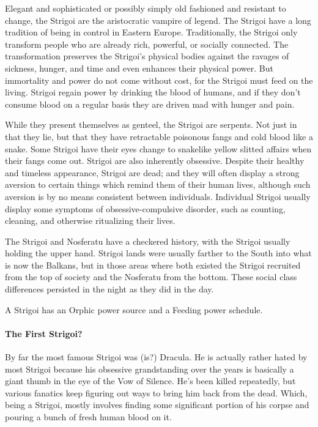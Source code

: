 Elegant and sophisticated or possibly simply old fashioned and resistant to change, the Strigoi are the aristocratic vampire of legend. The Strigoi have a long tradition of being in control in Eastern Europe. Traditionally, the Strigoi only transform people who are already rich, powerful, or socially connected. The transformation preserves the Strigoi's physical bodies against the ravages of sickness, hunger, and time and even enhances their physical power. But immortality and power do not come without cost, for the Strigoi must feed on the living. Strigoi regain power by drinking the blood of humans, and if they don't consume blood on a regular basis they are driven mad with hunger and pain.

While they present themselves as genteel, the Strigoi are serpents. Not just in that they lie, but that they have retractable poisonous fangs and cold blood like a snake. Some Strigoi have their eyes change to snakelike yellow slitted affairs when their fangs come out. Strigoi are also inherently obsessive. Despite their healthy and timeless appearance, Strigoi are dead; and they will often display a strong aversion to certain things which remind them of their human lives, although such aversion is by no means consistent between individuals. Individual Strigoi usually display some symptoms of obsessive-compulsive disorder, such as counting, cleaning, and otherwise ritualizing their lives.

The Strigoi and Nosferatu have a checkered history, with the Strigoi usually holding the upper hand. Strigoi lands were usually farther to the South into what is now the Balkans, but in those areas where both existed the Strigoi recruited from the top of society and the Nosferatu from the bottom. These social class differences persisted in the night as they did in the day.

A Strigoi has an Orphic power source and a Feeding power schedule.

\paragraph{The First Strigoi?} By far the most famous Strigoi was (is?) Dracula. He is actually rather hated by most Strigoi because his obsessive grandstanding over the years is basically a giant thumb in the eye of the Vow of Silence. He's been killed repeatedly, but various fanatics keep figuring out ways to bring him back from the dead. Which, being a Strigoi, mostly involves finding some significant portion of his corpse and pouring a bunch of fresh human blood on it.

